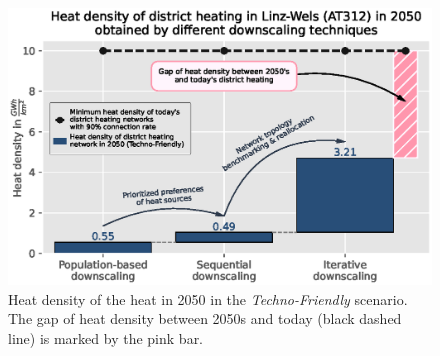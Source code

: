 \begin{figure}[h]
	\centering
	\includegraphics[width=0.9\linewidth]{figures/4_Results/Fig_Heat-density/HD_cleaned1.eps}
	\caption{Heat density of the  heat  in  2050 in the \textit{Techno-Friendly} scenario. The gap of heat density between 2050s and today (black dashed line) is marked by the pink bar.}
	\label{fig:res5}
\end{figure}

